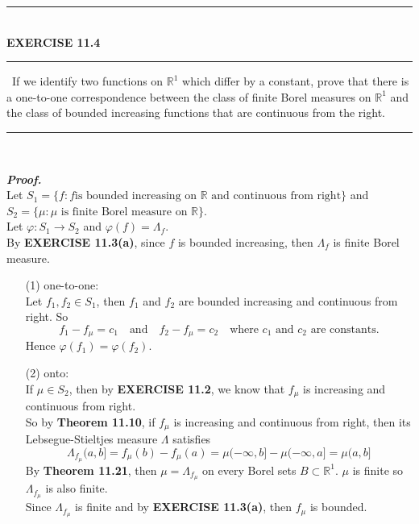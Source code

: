\documentclass[a4paper,11pt]{article}
\begin{document}
	\begin{flushleft}
		\rule[-0.5ex]{17cm}{2pt}\\
			\textbf{EXERCISE 11.4}\\
		\rule[1.5ex]{17cm}{0.5pt}\
			If we identify two functions on $\mathbb{R}^1$ which differ by a constant, prove that there is a one-to-one correspondence between the class of finite Borel measures on $\mathbb{R}^1$ and the class of bounded increasing functions that are continuous from the right.
		\rule[1.0ex]{17cm}{0.5pt}\
	\end{flushleft}
	\textit{\textbf {Proof.}}\\
		Let $S_1 = \{f : f \text{is bounded increasing on }\mathbb{R} \text{ and continuous from right}\}$
		and \\$S_2 = \{\mu : \mu \text{ is finite Borel measure on }\mathbb{R}\}$.\\
		Let $\varphi : S_1 \to S_2$ and $\varphi(f) = \Lambda_f$.\\
		By \textbf{EXERCISE 11.3(a)}, since $f$ is bounded increasing, then $\Lambda_f$ is finite Borel measure.
		\begin{enumerate}
			\item[(1)] one-to-one:\\
				Let $f_1, f_2 \in S_1$, then $f_1$ and $f_2$ are bounded increasing and continuous from right. So
					$$f_1 - f_\mu = c_1
					\quad \text{and} \quad
					f_2 - f_\mu = c_2
					\quad \text{where $c_1$ and $c_2$ are constants.}$$
				Hence $\varphi(f_1) = \varphi(f_2)$.\

			\item[(2)] onto:\\
				If $\mu \in S_2$, then by \textbf{EXERCISE 11.2}, we know that $f_\mu$ is increasing and continuous from right.\\
				So by \textbf{Theorem 11.10}, if $f_\mu$ is increasing and continuous from right, then its Lebsegue-Stieltjes measure $\Lambda$ satisfies
					$$\Lambda_{f_\mu}(a,b]
					= f_\mu(b) - f_\mu(a)
					= \mu(-\infty,b] - \mu(-\infty,a]
					= \mu(a,b]$$
				By \textbf{Theorem 11.21}, then $\mu = \Lambda_{f_\mu}$ on every Borel sets $B \subset \mathbb{R}^1$. $\mu$ is finite so $\Lambda_{f_\mu}$ is also finite.\\
				Since $\Lambda_{f_\mu}$ is finite and by \textbf{EXERCISE 11.3(a)}, then $f_\mu$ is bounded.
		\end{enumerate}
\end{document}
